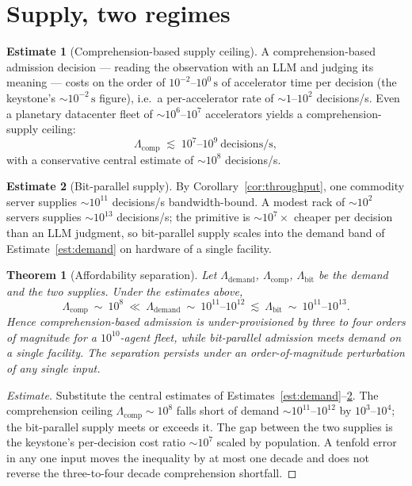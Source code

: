 \documentclass[11pt,oneside]{book}
\theoremstyle{definition}
\newtheorem{estimate}{Estimate}[chapter]
\theoremstyle{plain}
\newtheorem{theorem}{Theorem}[chapter]
\theoremstyle{remark}
\begin{document}
\section{Supply, two regimes}

\begin{estimate}[Comprehension-based supply ceiling]\label{est:comp-supply}
A comprehension-based admission decision --- reading the observation with an LLM and judging its meaning --- costs on the order of $10^{-2}$--$10^{0}\,\mathrm{s}$ of accelerator time per decision (the keystone's $\sim\!10^{-2}\,\mathrm{s}$ figure), i.e.\ a per-accelerator rate of $\sim\!1$--$10^{2}$ decisions/s. %
Even a planetary datacenter fleet of $\sim\!10^{6}$--$10^{7}$ accelerators yields a comprehension-supply ceiling:
\[
\Lambda_{\text{comp}}\;\lesssim\;10^{7}\text{--}10^{9}\ \text{decisions/s},
\]
with a conservative central estimate of $\sim\!10^{8}$ decisions/s. %
\end{estimate}

\begin{estimate}[Bit-parallel supply]\label{est:bit-supply}
By Corollary~\ref{cor:throughput}, one commodity server supplies $\sim\!10^{11}$ decisions/s bandwidth-bound. %
A modest rack of $\sim\!10^{2}$ servers supplies $\sim\!10^{13}$ decisions/s; the primitive is $\sim\!10^{7}\times$ cheaper per decision than an LLM judgment, so bit-parallel supply scales into the demand band of Estimate~\ref{est:demand} on hardware of a single facility. %
\end{estimate}

\begin{theorem}[Affordability separation]\label{thm:afford}
Let $\Lambda_{\text{demand}}$, $\Lambda_{\text{comp}}$, $\Lambda_{\text{bit}}$ be the demand and the two supplies. %
Under the estimates above,
\[
\Lambda_{\text{comp}}\ \sim\ 10^{8}\ \ll\ \Lambda_{\text{demand}}\ \sim\ 10^{11}\text{--}10^{12}\ \lesssim\ \Lambda_{\text{bit}}\ \sim\ 10^{11}\text{--}10^{13}.
\]
Hence comprehension-based admission is under-provisioned by three to four orders of magnitude for a $10^{10}$-agent fleet, while bit-parallel admission meets demand on a single facility. %
The separation persists under an order-of-magnitude perturbation of any single input. %
\end{theorem}

\begin{proof}[Estimate]
Substitute the central estimates of Estimates~\ref{est:demand}--\ref{est:bit-supply}. %
The comprehension ceiling $\Lambda_{\text{comp}}\sim 10^{8}$ falls short of demand $\sim\!10^{11}$--$10^{12}$ by $10^{3}$--$10^{4}$; the bit-parallel supply meets or exceeds it. %
The gap between the two supplies is the keystone's per-decision cost ratio $\sim\!10^{7}$ scaled by population. %
A tenfold error in any one input moves the inequality by at most one decade and does not reverse the three-to-four decade comprehension shortfall. %
\end{proof}
\end{document}
